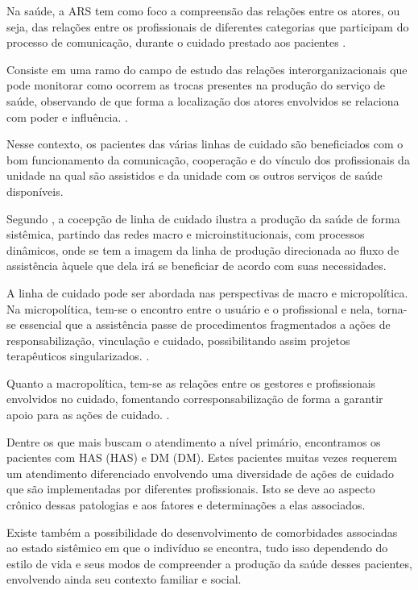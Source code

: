 Na saúde, a \acrlong{ARS} tem como foco a compreensão das relações entre os atores, ou seja, das relações entre os profissionais de diferentes categorias que participam do processo de comunicação, durante o cuidado prestado aos pacientes \cite{antonio2013}.
 
Consiste em uma ramo do campo de estudo das relações interorganizacionais que pode monitorar como ocorrem as trocas presentes na produção do serviço de saúde, observando de que forma a localização dos atores envolvidos se relaciona com poder e influência. \cite{bittencourt2009rede}.

Nesse contexto, os pacientes das várias linhas de cuidado são beneficiados com o bom funcionamento da comunicação, cooperação e do vínculo dos profissionais da unidade na qual são assistidos e da unidade com os outros serviços de saúde disponíveis. 

Segundo \cite{cecilio2003integralidade}, a cocepção de linha de cuidado ilustra a produção da saúde de forma sistêmica, partindo das redes macro e microinstitucionais, com processos dinâmicos, onde se tem a imagem da linha de produção direcionada ao fluxo de assistência àquele que dela irá se beneficiar de acordo com suas necessidades.

A linha de cuidado pode ser abordada nas perspectivas de macro e micropolítica. Na micropolítica, tem-se o encontro entre o usuário e o profissional e nela, torna-se essencial que a assistência passe de procedimentos fragmentados a ações de responsabilização, vinculação e cuidado, possibilitando assim projetos terapêuticos singularizados. \cite{malta2010percurso}.

Quanto a macropolítica, tem-se as relações entre os gestores e profissionais envolvidos no cuidado, fomentando corresponsabilização de forma a garantir apoio para as ações de cuidado. \cite{malta2010percurso}.

Dentre os que mais buscam o atendimento a nível primário, encontramos os pacientes com \acrlong{HAS} (\acrshort{HAS}) e \acrlong{DM} (\acrshort{DM}). Estes pacientes muitas vezes requerem um atendimento diferenciado envolvendo uma diversidade de ações de cuidado que são implementadas por diferentes profissionais. Isto se deve ao aspecto crônico dessas patologias e aos fatores e determinações  a elas associados. 

Existe também a possibilidade do desenvolvimento de comorbidades associadas ao estado sistêmico em que o indivíduo se encontra, tudo isso dependendo do estilo de vida e seus modos de compreender a produção da saúde desses pacientes, envolvendo ainda seu contexto familiar e social. 

